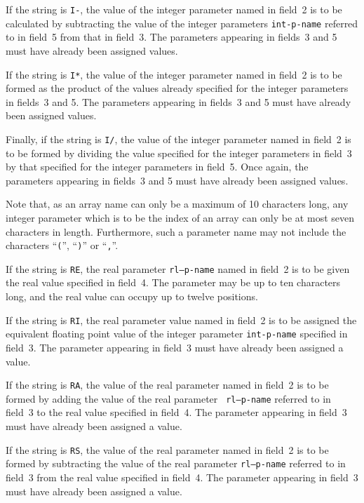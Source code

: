 \documentclass[a4paper]{article}
\begin{document}
If the string is {\tt I-},
the value of the integer parameter named in
field~2 is to  be calculated by  subtracting the value  of the integer
parameters {\tt int-p-name}  referred  to in field~5  from   that in
field~3. The parameters appearing in fields~3 and 5 must  have already
been assigned values.

If the string is {\tt I*},
the value of the integer parameter named in
field~2 is to be formed as the product of the values already specified
for the integer parameters in fields~3 and 5. The parameters appearing
in fields~3 and 5 must have already been assigned values.

Finally, if the string is {\tt I/},
the value of the integer parameter
named in field~2 is  to be formed by dividing  the value specified for
the  integer parameters in field~3  by that specified for the  integer
parameters   in field~5.  Once    again, the  parameters  appearing in
fields~3 and 5 must have already been assigned values.

Note that, as an array  name
can only  be a  maximum of 10  characters
long, any integer parameter which is to be the  index of an  array can
only  be at most seven  characters  in   length.  Furthermore, such  a
parameter name may not include the characters ``{\tt (}'', ``{\tt )}''
or ``{\tt ,}''.

If the string is {\tt RE},
the real parameter {\tt rl--p-name} named
in field~2  is to be  given the real value  specified  in field~4. The
parameter  may be up  to ten characters long, and  the real  value can
occupy up to twelve positions.

If the string is {\tt RI},
the real  parameter value named  in field~2
is to be assigned the equivalent floating point  value of  the integer
parameter  {\tt int-p-name} specified    in field~3.  The  parameter
appearing in field~3 must have already been assigned a value.

If the string is {\tt RA},
the value  of  the real parameter named in
field~2 is to be formed by adding the value of the real parameter {\tt
rl--p-name} referred to in field~3 to  the real  value specified in
field~4. The parameter  appearing in field~3  must  have  already been
assigned a value.

If the string is  {\tt RS},
the value  of the  real parameter named in
field~2 is to be formed by subtracting the value of the real parameter
{\tt rl--p-name}  referred  to  in  field~3   from the real   value
specified in field~4. The  parameter  appearing in field~3  must  have
already been assigned a value.
\end{document}
